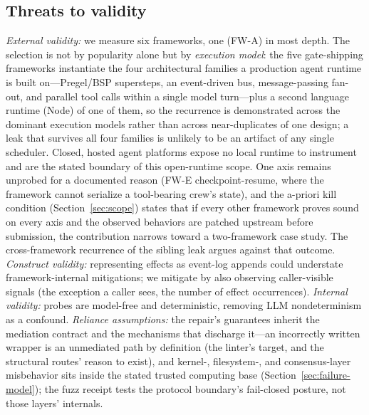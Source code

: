 \documentclass[10pt,journal,compsoc]{IEEEtran}
\begin{document}
\subsection{Threats to validity}
\label{sec:threats-validity}
\emph{External validity:} we measure six frameworks, one (\textsf{FW-A}) in
most depth. The selection is not by popularity alone but by \emph{execution
model}: the five gate-shipping frameworks instantiate the four architectural
families a production agent runtime is built on---Pregel/BSP supersteps, an
event-driven bus, message-passing fan-out, and parallel tool calls within a
single model turn---plus a second language runtime (Node) of one of them, so
the recurrence is demonstrated across the dominant execution models rather
than across near-duplicates of one design; a leak that survives all four
families is unlikely to be an artifact of any single scheduler. Closed,
hosted agent platforms expose no local runtime to instrument and are the
stated boundary of this open-runtime scope. One axis remains unprobed for a
documented reason (\textsf{FW-E}
checkpoint-resume, where the framework cannot serialize a tool-bearing crew's
state), and the a-priori
kill condition (Section~\ref{sec:scope}) states that if every other framework
proves sound on every axis and the observed behaviors are patched upstream before
submission, the contribution narrows toward a two-framework case study. The
cross-framework recurrence of the sibling leak argues against that outcome.
\emph{Construct validity:} representing effects as event-log appends could
understate framework-internal mitigations; we mitigate by also observing
caller-visible signals (the exception a caller sees, the number of effect
occurrences). \emph{Internal validity:} probes are model-free and deterministic,
removing LLM nondeterminism as a confound.
\emph{Reliance assumptions:} the repair's guarantees inherit the mediation
contract and the mechanisms that discharge it---an incorrectly written
wrapper is an unmediated path by definition (the linter's target, and the
structural routes' reason to exist), and kernel-, filesystem-, and
consensus-layer misbehavior sits inside the stated trusted computing base
(Section~\ref{sec:failure-model}); the fuzz receipt tests the protocol
boundary's fail-closed posture, not those layers' internals.

\end{document}
